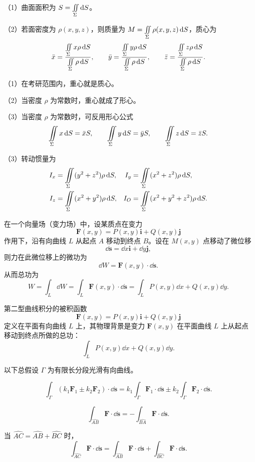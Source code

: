 
（1）曲面面积为 $S=\iint\limits_{\Sigma}\mathop{}\!\mathrm d S$。

（2）若面密度为 $\rho(x,y,z)$，则质量为 $M=\iint\limits_{\Sigma}\rho(x,y,z)\mathop{}\!\mathrm d S$，质心为
\[
\bar x=\frac{\iint\limits_{\Sigma} x\rho\mathop{}\!\mathrm d S}{\iint\limits_{\Sigma}\rho\mathop{}\!\mathrm d S},\qquad
\bar y=\frac{\iint\limits_{\Sigma} y\rho\mathop{}\!\mathrm d S}{\iint\limits_{\Sigma}\rho\mathop{}\!\mathrm d S},\qquad
\bar z=\frac{\iint\limits_{\Sigma} z\rho\mathop{}\!\mathrm d S}{\iint\limits_{\Sigma}\rho\mathop{}\!\mathrm d S}.
\]
\begin{notebox}
（1）在考研范围内，重心就是质心。

（2）当密度 $\rho$ 为常数时，重心就成了形心。

（3）当密度 $\rho$ 为常数时，可反用形心公式
\[
\iint\limits_{\Sigma} x\mathop{}\!\mathrm d S=\bar xS,\qquad
\iint\limits_{\Sigma} y\mathop{}\!\mathrm d S=\bar yS,\qquad
\iint\limits_{\Sigma} z\mathop{}\!\mathrm d S=\bar zS.
\]
\end{notebox}

（3）转动惯量为
\begin{align*}
I_x&=\iint\limits_{\Sigma}(y^2+z^2)\rho\mathop{}\!\mathrm d S,&
I_y&=\iint\limits_{\Sigma}(x^2+z^2)\rho\mathop{}\!\mathrm d S,\\
I_z&=\iint\limits_{\Sigma}(x^2+y^2)\rho\mathop{}\!\mathrm d S,&
I_O&=\iint\limits_{\Sigma}(x^2+y^2+z^2)\rho\mathop{}\!\mathrm d S.
\end{align*}



在一个向量场（变力场）中，设某质点在变力
\[
\bm F(x,y)=P(x,y)\bm i+Q(x,y)\bm j
\]
作用下，沿有向曲线 $L$ 从起点 $A$ 移动到终点 $B$。设在 $M(x,y)$ 点移动了微位移
\[
\dd\bm s=\dd x\bm i+\dd y\bm j,
\]
则力在此微位移上的微功为
\[
\dd W=\bm F(x,y)\cdot\dd\bm s.
\]
从而总功为
\[
W=\int_L\dd W
=\int_L\bm F(x,y)\cdot\dd\bm s
=\int_LP(x,y)\dd x+Q(x,y)\dd y.
\]


第二型曲线积分的被积函数
\[
\bm F(x,y)=P(x,y)\bm i+Q(x,y)\bm j
\]
定义在平面有向曲线 $L$ 上，其物理背景是变力 $\bm F(x,y)$ 在平面曲线 $L$ 上从起点移动到终点所做的总功：
\[
\int_LP(x,y)\dd x+Q(x,y)\dd y.
\]


以下总假设 $\Gamma$ 为有限长分段光滑有向曲线。

\[
\int_{\Gamma}(k_1\bm F_1\pm k_2\bm F_2)\cdot\dd\bm s
=k_1\int_{\Gamma}\bm F_1\cdot\dd\bm s
\pm k_2\int_{\Gamma}\bm F_2\cdot\dd\bm s.
\]

\[
\int_{\widehat{AB}}\bm F\cdot\dd\bm s
=-\int_{\widehat{BA}}\bm F\cdot\dd\bm s.
\]

当 $\widehat{AC}=\widehat{AB}+\widehat{BC}$ 时，
\[
\int_{\widehat{AC}}\bm F\cdot\dd\bm s
=\int_{\widehat{AB}}\bm F\cdot\dd\bm s
+\int_{\widehat{BC}}\bm F\cdot\dd\bm s.
\]

